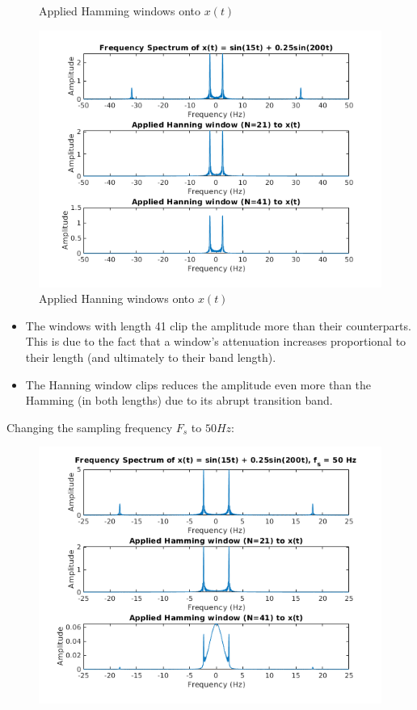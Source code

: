 \documentclass[12pt, a4paper]{article}
\begin{document}
\begin{enumerate}
\begin{figure}[H]
        \caption{Applied Hamming windows onto \(x(t)\)}
    \end{figure}
    \begin{figure}[H]
        \centering
        \includegraphics[scale=0.8]{hann_sig.png}
        \caption{Applied Hanning windows onto \(x(t)\)}
    \end{figure}
    \begin{itemize}
        \item The windows with length 41 clip the amplitude more than their counterparts. This is due to the fact that a window's 
        attenuation increases proportional to their length (and ultimately to their band length).
        \item The Hanning window clips reduces the amplitude even more than the Hamming (in both lengths) due to its abrupt transition band.
    \end{itemize}
    Changing the sampling frequency \(F_s\) to \(50 Hz\):
    \begin{figure}[H]
        \centering
        \includegraphics[scale=0.9]{hamm_sig_50.png}

\end{figure}
\end{enumerate}
\end{document}
